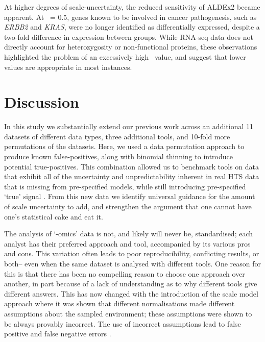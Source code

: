 \documentclass[10pt,letterpaper]{article}
\begin{document}
At higher degrees of scale-uncertainty, the reduced sensitivity of ALDEx2 became apparent. At \textgamma~= 0.5, genes known to be involved in cancer pathogenesis, such as \textit{ERBB2} and \textit{KRAS}, were no longer identified as differentially expressed, despite a two-fold difference in expression between groups. While RNA-seq data does not directly account for heterozygosity or non-functional proteins, these observations highlighted the problem of an excessively high \textgamma~value, and suggest that lower values are appropriate in most instances.


\section*{Discussion}

In this study we substantially extend our previous work across an additional 11 datasets of different data types, three additional tools, and 10-fold more permutations of the datasets. Here, we used a data permutation approach \cite{li_exaggerated_2022} to produce known false-positives, along with binomial thinning \cite{gerard_data-based_2020} to introduce potential true-positives. This combination allowed us to benchmark tools on data that exhibit all of the uncertainty and unpredictability inherent in real HTS data that is missing from pre-specified models, while still introducing pre-specified `true' signal \cite{gerard_data-based_2020}. From this new data we identify universal guidance for the amount of scale uncertainty to add, and strengthen the argument that one cannot have one's statistical cake and eat it. 

The analysis of `-omics' data is not, and likely will never be, standardised; each analyst has their preferred approach and tool, accompanied by its various pros and cons. This variation often leads to poor reproducibility, conflicting results, or both-- even when the same dataset is analysed with different tools. One reason for this is that there has been no compelling reason to choose one approach over another, in part because of a lack of understanding as to why different tools give different answers. This has now changed with the introduction of the scale model approach \cite{nixon_scale_2024} where it was shown that different normalisations made different assumptions about the sampled environment; these assumptions were shown to be always provably incorrect. The use of incorrect assumptions lead to false positive and false negative errors \cite{nixon_scale_2024, nixon_incorporating_2025, gloor_explicit_2025, mcgovern_replacing_2025}.
\end{document}

